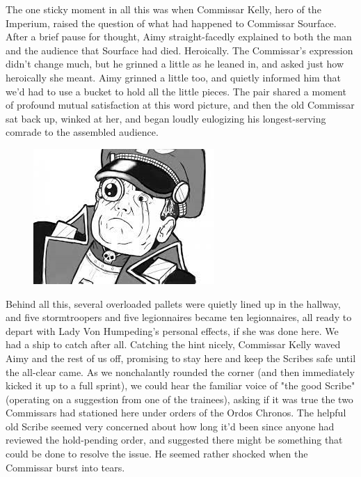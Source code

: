 The one sticky moment in all this was when Commissar Kelly, hero of the Imperium, raised the question of what had happened to Commissar Sourface. 
After a brief pause for thought, Aimy straight-facedly explained to both the man and the audience that Sourface had died. 
Heroically. 
The Commissar's expression didn't change much, but he grinned a little as he leaned in, and asked just how heroically she meant. 
Aimy grinned a little too, and quietly informed him that we'd had to use a bucket to hold all the little pieces. 
The pair shared a moment of profound mutual satisfaction at this word picture, and then the old Commissar sat back up, winked at her, and began loudly eulogizing his longest-serving comrade to the assembled audience.

\begin{figure}
	\begin{center}
		\includegraphics[width=\figwidth]{pics/21/113.png}
	\end{center}
\end{figure}
Behind all this, several overloaded pallets were quietly lined up in the hallway, and five stormtroopers and five legionnaires became ten legionnaires, all ready to depart with Lady Von Humpeding's personal effects, if she was done here. 
We had a ship to catch after all. 
Catching the hint nicely, Commissar Kelly waved Aimy and the rest of us off, promising to stay here and keep the Scribes safe until the all-clear came. 
As we nonchalantly rounded the corner (and then immediately kicked it up to a full sprint), we could hear the familiar voice of "the good Scribe" (operating on a suggestion from one of the trainees), asking if it was true the two Commissars had stationed here under orders of the Ordos Chronos. 
The helpful old Scribe seemed very concerned about how long it'd been since anyone had reviewed the hold-pending order, and suggested there might be something that could be done to resolve the issue. 
He seemed rather shocked when the Commissar burst into tears.

